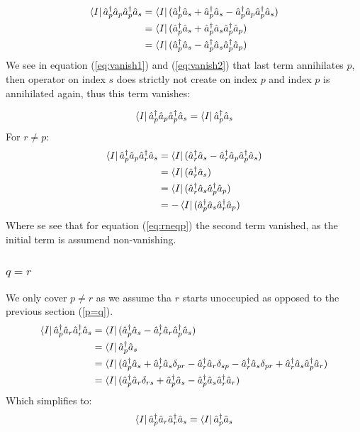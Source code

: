 \begin{align}
    \bra{I} \hat{a}^\dagger_p \hat{a}_p \hat{a}^\dagger_p \hat{a}_s & =   \bra{I} (\hat{a}^\dagger_p \hat{a}_s + \hat{a}^\dagger_p \hat{a}_s - \hat{a}^\dagger_p \hat{a}_p \hat{a}^\dagger_p \hat{a}_s ) \\
  & =   \bra{I} (\hat{a}^\dagger_p \hat{a}_s + \hat{a}^\dagger_p \hat{a}_s \hat{a}^\dagger_p \hat{a}_p) \label{eq:vanish1} \\
  & =   \bra{I} (\hat{a}^\dagger_p \hat{a}_s - \hat{a}^\dagger_p \hat{a}_s \hat{a}^\dagger_p \hat{a}_p) \label{eq:vanish2}
\end{align}
We see in equation (\ref{eq:vanish1}) and (\ref{eq:vanish2}) that last term annihilates $p$, then operator on index $s$ does strictly not create on index $p$ and index $p$ is annihilated again, thus this term vanishes:

\begin{equation}
 \bra{I}  \hat{a}^\dagger_p \hat{a}_p \hat{a}^\dagger_p \hat{a}_s = \bra{I} \hat{a}^\dagger_p \hat{a}_s
\end{equation}
For $r \neq p$:
\begin{align}
    \bra{I} \hat{a}^\dagger_p \hat{a}_p \hat{a}^\dagger_r \hat{a}_s & =   \bra{I} ( \hat{a}^\dagger_r  \hat{a}_s - \hat{a}^\dagger_r \hat{a}_p \hat{a}^\dagger_p \hat{a}_s ) \nonumber \\
  & =   \bra{I} (\hat{a}^\dagger_r  \hat{a}_s) \label{eq:rneqp}\\
  & =   \bra{I} ( \hat{a}^\dagger_r \hat{a}_s \hat{a}^\dagger_p \hat{a}_p) \\
  & = -   \bra{I} (\hat{a}^\dagger_p \hat{a}_s \hat{a}^\dagger_r \hat{a}_p)
\end{align}
Where se see that for equation (\ref{eq:rneqp}) the second term vanished, as the initial term is assumend non-vanishing.

\subsubsection{$q=r$}
We only cover $p \neq r$ as we assume tha $r$ starts unoccupied as opposed to the previous section (\ref{p=q}).
\begin{align}
  \bra{I} \hat{a}^\dagger_p \hat{a}_r \hat{a}^\dagger_r \hat{a}_s & =   \bra{I} (\hat{a}^\dagger_p \hat{a}_s - \hat{a}^\dagger_r \hat{a}_r \hat{a}^\dagger_p \hat{a}_s) \nonumber \\
  & =   \bra{I} \hat{a}^\dagger_p \hat{a}_s  \\
  & =   \bra{I} (\hat{a}^\dagger_p \hat{a}_s + \hat{a}^\dagger_r \hat{a}_s \delta_{pr} - \hat{a}^\dagger_r \hat{a}_r  \delta_{sp} - \hat{a}^\dagger_r \hat{a}_s \delta_{pr} + \hat{a}^\dagger_r \hat{a}_s \hat{a}^\dagger_p \hat{a}_r) \\
  & =   \bra{I} (\hat{a}^\dagger_p \hat{a}_r \delta_{rs} + \hat{a}^\dagger_p \hat{a}_s - \hat{a}^\dagger_p \hat{a}_s \hat{a}^\dagger_r \hat{a}_r)
\end{align}
Which simplifies to:
\begin{equation}
    \bra{I} \hat{a}^\dagger_p \hat{a}_r \hat{a}^\dagger_r \hat{a}_s =   \bra{I} \hat{a}^\dagger_p \hat{a}_s
\end{equation}


